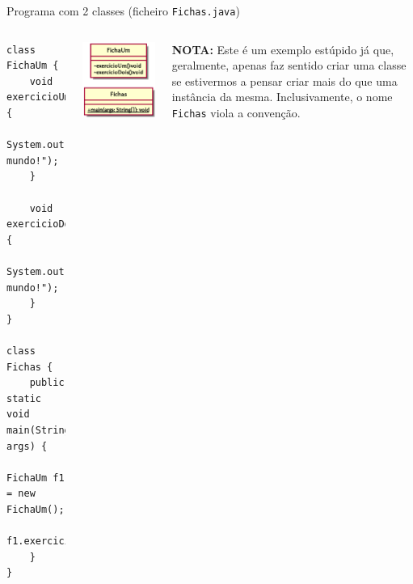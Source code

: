 \documentclass[portuguese, aspectratio=169, xcolor=table]{beamer}
\begin{document}
\begin{frame}[fragile]{Programa com 2 classes (ficheiro \texttt{Fichas.java})}
\begin{columns}
\begin{verbatim}
class FichaUm {
    void exercicioUm() {
        System.out.println("Olá mundo!");
    }

    void exercicioDois() {
        System.out.println("Adeus mundo!");
    }
}

class Fichas {
    public static void main(String[] args) {
        FichaUm f1 = new FichaUm();
        f1.exercicioUm();
    }
}
\end{verbatim}
\begin{center}
    \includegraphics[width=0.5\linewidth]{./uml_diagrams/class2}
\end{center}
\vspace{0.5cm}
\tiny \textbf{NOTA:} Este é um exemplo estúpido já que, geralmente, apenas faz sentido criar uma classe se estivermos a pensar criar mais do que uma instância da mesma. Inclusivamente, o nome \texttt{Fichas} viola a convenção.
\end{columns}

\end{frame}
\end{document}
